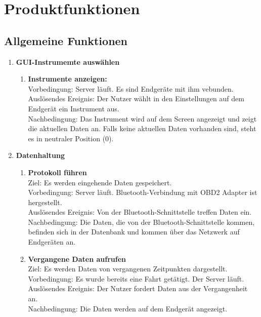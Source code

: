 \documentclass[pflichtenheft.tex]{subfiles}
\begin{document}
\chapter{Produktfunktionen}

\section{Allgemeine Funktionen}

\begin{enumerate}

	
	\item{\textbf{GUI-Instrumemte auswählen}}
	
	\begin{enumerate}
	\item{\textbf{Instrumente anzeigen:}} \\ Vorbedingung: Server läuft. Es sind Endgeräte mit ihm vebunden.\\ Auslösendes Ereignis: Der Nutzer wählt in den Einstellungen auf dem Endgerät ein Instrument aus.\\ Nachbedingung: Das Instrument wird auf dem Screen angezeigt und zeigt die aktuellen Daten an. Falls keine aktuellen Daten vorhanden sind, steht es in neutraler Position (0).
	\end{enumerate} 
	
	
	\item{\textbf{Datenhaltung}}

	\begin{enumerate}
	
		\item{\textbf{Protokoll führen}} \\ Ziel: Es werden eingehende Daten gespeichert. \\ Vorbedingung: Server läuft. Bluetooth-Verbindung mit OBD2 Adapter ist hergestellt. \\ Auslösendes Ereignis: Von der Bluetooth-Schnittstelle treffen Daten ein. %
		Nachbedingung: Die Daten, die von der Bluetooth-Schnittstelle kommen, befinden sich in der Datenbank und kommen über das Netzwerk auf Endgeräten an.
		
		\item{\textbf{Vergangene Daten aufrufen}} \\ Ziel: Es werden Daten von vergangenen Zeitpunkten dargestellt. \\ Vorbedingung: Es wurde bereits eine Fahrt getätigt. Der Server läuft.\\ Auslösendes Ereignis: Der Nutzer fordert Daten aus der Vergangenheit an. \\ Nachbedingung: Die Daten werden auf dem Endgerät angezeigt.
	

\end{enumerate}
\end{enumerate}
\end{document}
